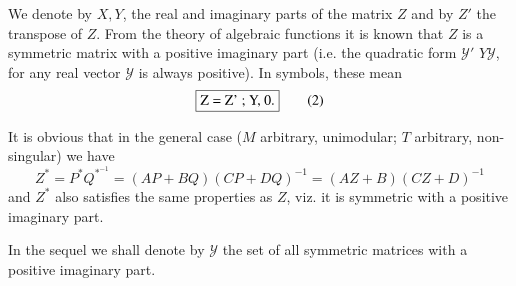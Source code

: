 We denote by $X, Y$, the real and imaginary parts of the matrix $Z$
and by $Z'$ the transpose of $Z$. From the theory of algebraic
functions it is known that $Z$ is a symmetric matrix with a positive
imaginary part (i.e. the quadratic form $\mathscr{Y}'$ $Y\mathscr{Y}$,
for any real vector $\mathscr{Y}$ is always 
positive). In symbols, these mean 
\begin{equation*}
\fbox{Z = Z' ; Y, 0.}\tag{2}\label{eq2}
\end{equation*}

It is obvious that in the general case ($M$ arbitrary, unimodular; $T$
arbitrary, non-singular) we have  
$$
Z^* = P^* Q^{*^{-1}} = (AP + BQ)  (CP + DQ)^{-1} = (AZ + B)   (CZ +
D)^{-1} 
$$
and $Z^*$ also satisfies the same properties as $Z$, viz. it is
symmetric with a positive imaginary part. 

In the sequel we shall denote by $\mathscr{Y}$ the set of all
symmetric matrices with a positive imaginary part. 

